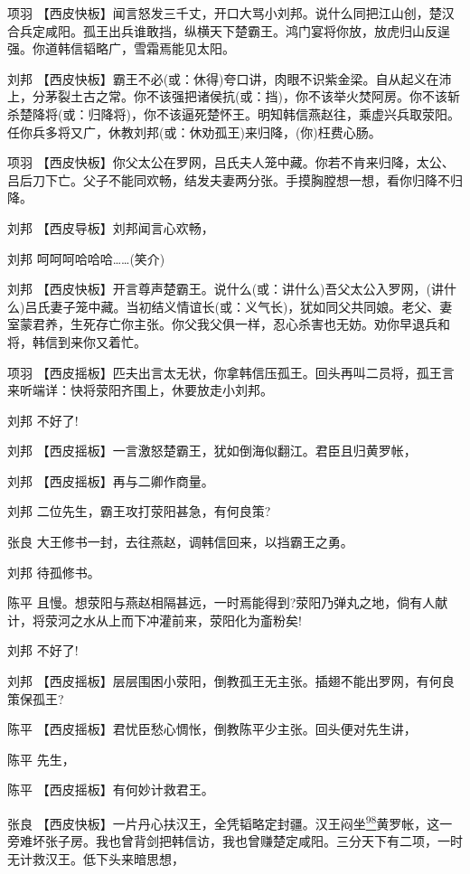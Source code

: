 项羽
【西皮快板】闻言怒发三千丈，开口大骂小刘邦。说什么同把江山创，楚汉合兵定咸阳。孤王出兵谁敢挡，纵横天下楚霸王。鸿门宴将你放，放虎归山反逞强。你道韩信韬略广，雪霜焉能见太阳。

刘邦
【西皮快板】霸王不必(或：休得)夸口讲，肉眼不识紫金梁。自从起义在沛上，分茅裂土古之常。你不该强把诸侯抗(或：挡)，你不该举火焚阿房。你不该斩杀楚降将(或：归降将)，你不该逼死楚怀王。明知韩信燕赵往，乘虚兴兵取荥阳。任你兵多将又广，休教刘邦(或：休劝孤王)来归降，(你)枉费心肠。

项羽
【西皮快板】你父太公在罗网，吕氏夫人笼中藏。你若不肯来归降，太公、吕后刀下亡。父子不能同欢畅，结发夫妻两分张。手摸胸膛想一想，看你归降不归降。

刘邦 【西皮导板】刘邦闻言心欢畅，

刘邦 呵呵呵哈哈哈\ldots{}\ldots{}(笑介)

刘邦
【西皮快板】开言尊声楚霸王。说什么(或：讲什么)吾父太公入罗网，(讲什么)吕氏妻子笼中藏。当初结义情谊长(或：义气长)，犹如同父共同娘。老父、妻室蒙君养，生死存亡你主张。你父我父俱一样，忍心杀害也无妨。劝你早退兵和将，韩信到来你又着忙。

项羽
【西皮摇板】匹夫出言太无状，你拿韩信压孤王。回头再叫二员将，孤王言来听端详：快将荥阳齐围上，休要放走小刘邦。

刘邦 不好了!

刘邦 【西皮摇板】一言激怒楚霸王，犹如倒海似翻江。君臣且归黄罗帐，

刘邦 【西皮摇板】再与二卿作商量。

刘邦 二位先生，霸王攻打荥阳甚急，有何良策?

张良 大王修书一封，去往燕赵，调韩信回来，以挡霸王之勇。

刘邦 待孤修书。

陈平
且慢。想荥阳与燕赵相隔甚远，一时焉能得到?荥阳乃弹丸之地，倘有人献计，将荥河之水从上而下冲灌前来，荥阳化为齑粉矣!

刘邦 不好了!

刘邦
【西皮摇板】层层围困小荥阳，倒教孤王无主张。插翅不能出罗网，有何良策保孤王?

陈平 【西皮摇板】君忧臣愁心惆怅，倒教陈平少主张。回头便对先生讲，

陈平 先生，

陈平 【西皮摇板】有何妙计救君王。

张良
【西皮快板】一片丹心扶汉王，全凭韬略定封疆。汉王闷坐\protect\hyperlink{fn98}{\textsuperscript{98}}黄罗帐，这一旁难坏张子房。我也曾背剑把韩信访，我也曾赚楚定咸阳。三分天下有二项，一时无计救汉王。低下头来暗思想，

